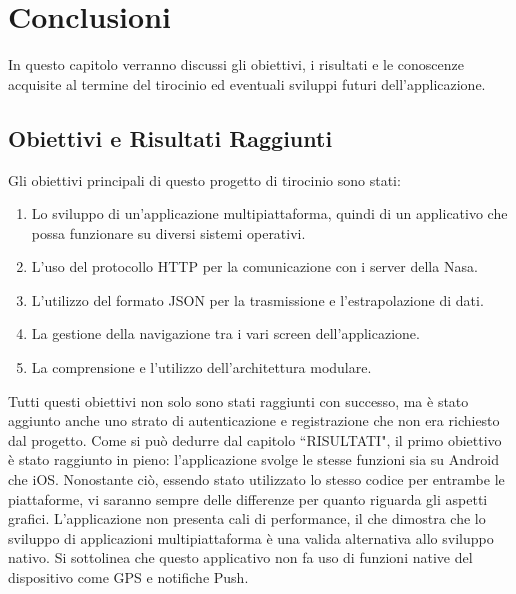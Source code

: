 \chapter*{Conclusioni}
\markboth{}{}

In questo capitolo verranno discussi gli obiettivi, i risultati e le conoscenze acquisite al termine del tirocinio ed eventuali sviluppi futuri dell'applicazione.

\section{Obiettivi e Risultati Raggiunti}
Gli obiettivi principali di questo progetto di tirocinio sono stati:
\begin{enumerate}
    \item Lo sviluppo di un'applicazione multipiattaforma, quindi di un applicativo che possa funzionare su diversi sistemi operativi.
    \item L'uso del protocollo HTTP per la comunicazione con i server della Nasa.
    \item L'utilizzo del formato JSON per la trasmissione e l'estrapolazione di dati.
    \item La gestione della navigazione tra i vari screen dell'applicazione.
    \item La comprensione e l'utilizzo dell'architettura modulare.
\end{enumerate}

Tutti questi obiettivi non solo sono stati raggiunti con successo, ma \`e stato aggiunto anche uno strato di autenticazione e registrazione che non era richiesto dal progetto.
Come si pu\`o dedurre dal capitolo ``RISULTATI", il primo obiettivo \`e stato raggiunto in pieno: l'applicazione svolge le stesse funzioni sia su Android che iOS. Nonostante ci\`o, essendo stato
utilizzato lo stesso codice per entrambe le piattaforme, vi saranno sempre delle differenze per quanto riguarda gli aspetti grafici. L'applicazione non presenta
cali di performance, il che dimostra che lo sviluppo di applicazioni multipiattaforma \`e una valida alternativa allo sviluppo nativo.
Si sottolinea che questo applicativo non fa uso di funzioni native del dispositivo come GPS e notifiche Push.

